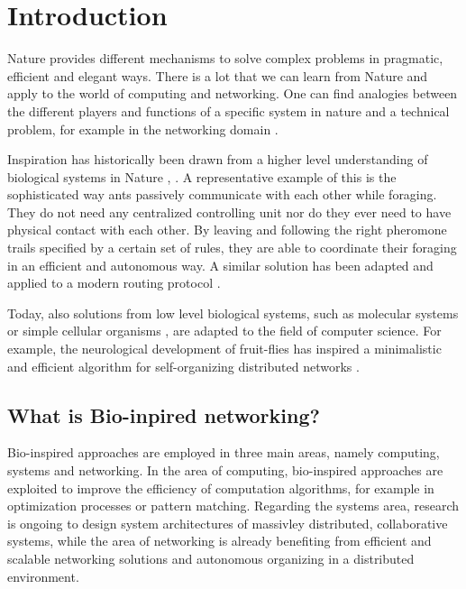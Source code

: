 \documentclass{IWORK2014}
\begin{document}


\section{Introduction}

Nature provides different mechanisms to solve complex problems in pragmatic, efficient and elegant ways. There is a lot that we can learn from Nature and apply to the world of computing and networking. One can find analogies between the different players and functions of a specific system in nature and a technical problem, for example in the networking domain \cite{dressler2010bio}.

Inspiration has historically been drawn from a higher level understanding of biological systems in Nature \cite{kroeker2011biology}, \cite{liu2012physarum}. A representative example of this is the sophisticated way ants passively communicate with each other while foraging. They do not need any centralized controlling unit nor do they ever need to have physical contact with each other. By leaving and following the right pheromone trails specified by a certain set of rules, they are able to coordinate their foraging in an efficient and autonomous way. A similar solution has been adapted and applied to a modern routing protocol \cite{dressler2010bio}.

Today, also solutions from low level biological systems, such as molecular systems \cite{kroeker2011biology} or simple cellular organisms \cite{liu2012physarum}, are adapted to the field of computer science. For example, the neurological development of fruit-flies has inspired a minimalistic and efficient algorithm for self-organizing distributed networks \cite{kroeker2011biology}.

\subsection{What is Bio-inpired networking?}
Bio-inspired approaches are employed in three main areas, namely computing, systems and networking. In the area of computing, bio-inspired approaches are exploited to improve the efficiency of computation algorithms, for example in optimization processes or pattern matching. Regarding the systems area, research is ongoing to design system architectures of massivley distributed, collaborative systems, while the area of networking is already benefiting from efficient and scalable networking solutions and autonomous organizing in a distributed environment. \cite{dressler2010bio}
\end{document}
